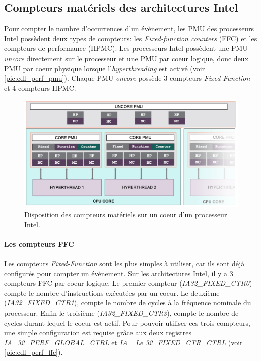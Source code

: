     \subsection{Compteurs matériels des architectures Intel}
        

        Pour compter le nombre d'occurrences d'un évènement, les PMU des processeurs Intel possèdent deux types de compteurs: les \textit{Fixed-function counters} (FFC) et les compteurs de performance (HPMC). Les processeurs Intel possèdent une PMU \textit{uncore} directement sur le processeur et une PMU par coeur logique, donc deux PMU par coeur physique lorsque l'\textit{hyperthreading} est activé (voir \autoref{pic:edl_perf_pmu}). Chaque PMU \textit{oncore} possède 3 compteurs \textit{Fixed-Function} et 4 compteurs HPMC.
        
        \begin{figure}
        \center
        \includegraphics[width=12cm]{images/edl_perf_pmu.png}
        \caption{\label{pic:edl_perf_pmu} Disposition des compteurs matériels sur un coeur d'un processeur Intel.}
        \end{figure}
    
        \paragraph{Les compteurs FFC}
        
            Les compteurs \textit{Fixed-Function} sont les plus simples à utiliser, car ils sont déjà configurés pour compter un évènement. Sur les architectures Intel, il y a 3 compteurs FFC par coeur logique. Le premier compteur (\textit{IA32\_FIXED\_CTR0}) compte le nombre d'instructions exécutées par un coeur. Le deuxième (\textit{IA32\_FIXED\_CTR1}), compte le nombre de cycles à la fréquence nominale du processeur. Enfin le troisième (\textit{IA32\_FIXED\_CTR3}), compte le nombre de cycles durant lequel le coeur est actif. Pour pouvoir utiliser ces trois compteurs, une simple configuration est requise grâce aux deux registres \textit{IA\_32\_PERF\_GLOBAL\_CTRL} et \textit{IA\_ Le 32\_FIXED\_CTR\_CTRL} (voir \autoref{pic:edl_perf_ffc}). 
            
